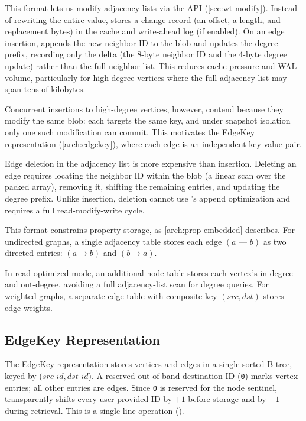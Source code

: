 This format lets us modify adjacency lists via the  API (\autoref{sec:wt-modify}).
Instead of rewriting the entire value,  stores a change record (an offset, a length, and replacement bytes) in the \wt{} cache and write-ahead log (if enabled).
On an edge insertion,  appends the new neighbor ID to the blob and updates the degree prefix, recording only the delta (the 8-byte neighbor ID and the 4-byte degree update) rather than the full neighbor list.
This reduces cache pressure and \ac{WAL} volume, particularly for high-degree vertices where the full adjacency list may span tens of kilobytes.

Concurrent insertions to high-degree vertices, however, contend because they modify the same blob: each  targets the same key, and under snapshot isolation only one such modification can commit.
This motivates the EdgeKey representation (\autoref{arch:edgekey}), where each edge is an independent key-value pair.

Edge deletion in the adjacency list is more expensive than insertion.
Deleting an edge requires locating the neighbor ID within the blob (a linear scan over the packed array), removing it, shifting the remaining entries, and updating the degree prefix.
Unlike insertion, deletion cannot use 's append optimization and requires a full read-modify-write cycle.

This format constrains property storage, as \autoref{arch:prop-embedded} describes.
For undirected graphs, a single adjacency table stores each edge $(a\text{ --- }b)$ as two directed entries: $(a \rightarrow b)$ and $(b \rightarrow a)$.

In read-optimized mode, an additional node table stores each vertex's in-degree and out-degree, avoiding a full adjacency-list scan for degree queries.
For weighted graphs, a separate edge table with composite key $(src, dst)$ stores edge weights.



\subsection{EdgeKey Representation}
\label{arch:edgekey}
The EdgeKey representation stores vertices and edges in a single sorted B-tree, keyed by ($src\_id, dst\_id$).
A reserved out-of-band destination ID (\texttt{0}) marks vertex entries; all other entries are edges.
Since \texttt{0} is reserved for the node sentinel, \project{} transparently shifts every user-provided ID by $+1$ before storage and by $-1$ during retrieval.
This is a single-line operation ().

